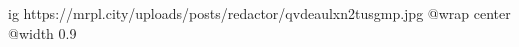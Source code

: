  
 
 
 
 

\ifcmt
  ig https://mrpl.city/uploads/posts/redactor/qvdeaulxn2tusgmp.jpg
  @wrap center
  @width 0.9
\fi

